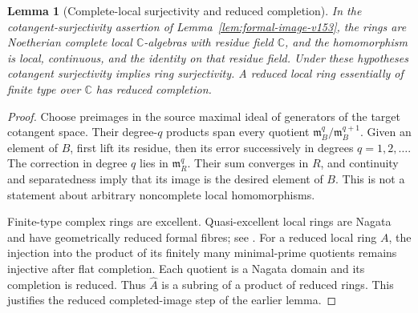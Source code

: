 \documentclass[11pt,reqno]{amsart}
\numberwithin{equation}{section}
\newtheorem{lemma}[theorem]{Lemma}
\theoremstyle{definition}\newtheorem{definition}[theorem]{Definition}
\theoremstyle{remark}\newtheorem{remark}[theorem]{Remark}
\newcommand{\C}{\mathbb C}\newcommand{\Q}{\mathbb Q}
\begin{document}
\begin{lemma}[Complete-local surjectivity and reduced completion]
\label{lem:complete-local-v154}
In the cotangent-surjectivity assertion of
Lemma~\ref{lem:formal-image-v153}, the rings are Noetherian complete
local $\C$-algebras with residue field $\C$, and the homomorphism
is local, continuous, and the identity on that residue field. Under
these hypotheses cotangent surjectivity implies ring surjectivity.
A reduced local ring essentially of finite type over $\C$ has
reduced completion.
\end{lemma}
\begin{proof}
Choose preimages in the source maximal ideal of generators of the
target cotangent space. Their degree-$q$ products span every quotient
$\mathfrak m_B^q/\mathfrak m_B^{q+1}$. Given an element of $B$, first
lift its residue, then its error successively in degrees $q=1,2,\ldots$.
The correction in degree $q$ lies in $\mathfrak m_R^q$. Their sum
converges in $R$, and continuity and separatedness imply that its
image is the desired element of $B$. This is not a statement about
arbitrary noncomplete local homomorphisms.

Finite-type complex rings are excellent. Quasi-excellent local
rings are Nagata and have geometrically reduced formal fibres;
see \cite[Tags 07QV and 0BJ0]{StacksLocalV154}. For a reduced local
ring $A$, the injection into the product of its finitely many
minimal-prime quotients remains injective after flat completion.
Each quotient is a Nagata domain and its completion is reduced.
Thus $\widehat A$ is a subring of a product of reduced rings.
This justifies the reduced completed-image step of the earlier lemma.
\end{proof}
\end{document}

